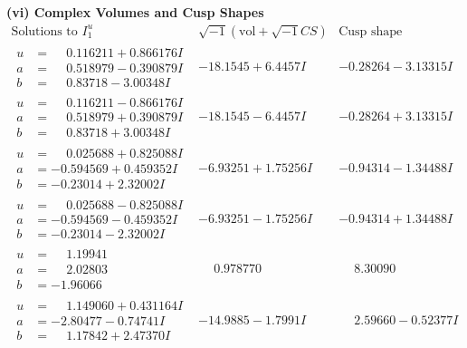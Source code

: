 \documentclass[1p]{elsarticle_modified}
\theoremstyle{definition}
\newcommand{\I}{\sqrt{-1}}
\begin{document}
\newpage\flushleft \textbf{(vi) Complex Volumes and Cusp Shapes}
$$\begin{array}{c|c|c}  
\text{Solutions to }I^u_{1}& \I (\text{vol} + \sqrt{-1}CS) & \text{Cusp shape}\\
 \hline 
\begin{aligned}
u &= \phantom{-}0.116211 + 0.866176 I \\
a &= \phantom{-}0.518979 - 0.390879 I \\
b &= \phantom{-}0.83718 - 3.00348 I\end{aligned}
 & -18.1545 + 6.4457 I & -0.28264 - 3.13315 I \\ \hline\begin{aligned}
u &= \phantom{-}0.116211 - 0.866176 I \\
a &= \phantom{-}0.518979 + 0.390879 I \\
b &= \phantom{-}0.83718 + 3.00348 I\end{aligned}
 & -18.1545 - 6.4457 I & -0.28264 + 3.13315 I \\ \hline\begin{aligned}
u &= \phantom{-}0.025688 + 0.825088 I \\
a &= -0.594569 + 0.459352 I \\
b &= -0.23014 + 2.32002 I\end{aligned}
 & -6.93251 + 1.75256 I & -0.94314 - 1.34488 I \\ \hline\begin{aligned}
u &= \phantom{-}0.025688 - 0.825088 I \\
a &= -0.594569 - 0.459352 I \\
b &= -0.23014 - 2.32002 I\end{aligned}
 & -6.93251 - 1.75256 I & -0.94314 + 1.34488 I \\ \hline\begin{aligned}
u &= \phantom{-}1.19941\phantom{ +0.000000I} \\
a &= \phantom{-}2.02803\phantom{ +0.000000I} \\
b &= -1.96066\phantom{ +0.000000I}\end{aligned}
 & \phantom{-}0.978770\phantom{ +0.000000I} & \phantom{-}8.30090\phantom{ +0.000000I} \\ \hline\begin{aligned}
u &= \phantom{-}1.149060 + 0.431164 I \\
a &= -2.80477 - 0.74741 I \\
b &= \phantom{-}1.17842 + 2.47370 I\end{aligned}
 & -14.9885 - 1.7991 I & \phantom{-}2.59660 - 0.52377 I \\ \hline\begin{aligned}

\end{aligned}
\end{array}$$
\end{document}
